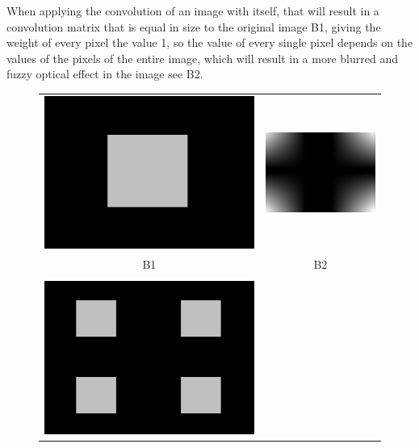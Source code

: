 \documentclass[a4paper,twocolumn]{article}
\begin{document}
	When applying the convolution of an image with itself, that will result in a convolution matrix that is equal in size to the original image B1, giving the weight of every pixel the value 1, so the value of every single pixel depends on the values of the pixels of the entire image, which will result in a more blurred and fuzzy optical effect in the image see B2.
	
	\begin{figure} [t]
		\centering
		\begin{tabular}{c c}
			\includegraphics[width=0.8\columnwidth]{figures/B1.png}
			&
			\includegraphics[width=0.8\columnwidth]{figures/B2.png}\\
			B1 & B2\\
			& \\
			\includegraphics[width=0.8\columnwidth]{figures/B1_ext.png}

\end{tabular}
\end{figure}
\end{document}
